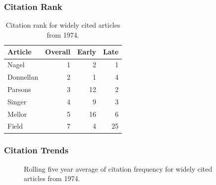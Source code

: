 \documentclass[
  10pt,
  letterpaper,
  DIV=11,
  numbers=noendperiod,
  twoside]{scrartcl}
\begin{document}
\subsubsection*{Citation Rank}\label{sec-rank-1974}

\begin{longtable}[]{@{}lrrr@{}}

\caption{\label{tbl-citation-rank-1974}Citation rank for widely cited
articles from 1974.}

\tabularnewline

\toprule\noalign{}
Article & Overall & Early & Late \\
\midrule\noalign{}
\endhead
\bottomrule\noalign{}
\endlastfoot
Nagel & 1 & 2 & 1 \\
Donnellan & 2 & 1 & 4 \\
Parsons & 3 & 12 & 2 \\
Singer & 4 & 9 & 3 \\
Mellor & 5 & 16 & 6 \\
Field & 7 & 4 & 25 \\

\end{longtable}

\subsubsection*{Citation Trends}\label{sec-trends-1974}

\begin{figure}


\caption{\label{fig-citation-spaghetti-1974}Rolling five year average of
citation frequency for widely cited articles from 1974.}

\end{figure}%
\end{document}
